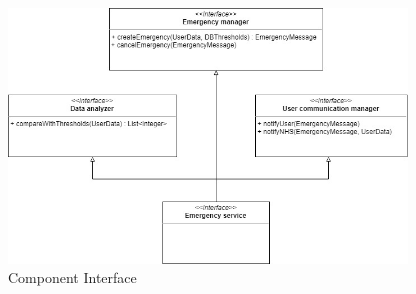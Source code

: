 \begin{figure}
    \centering
    \includegraphics[width=300pt]{images/CompInterfaces/Component_interfaces2.jpg}
    \caption{Component Interface}
\end{figure}


\clearpage

